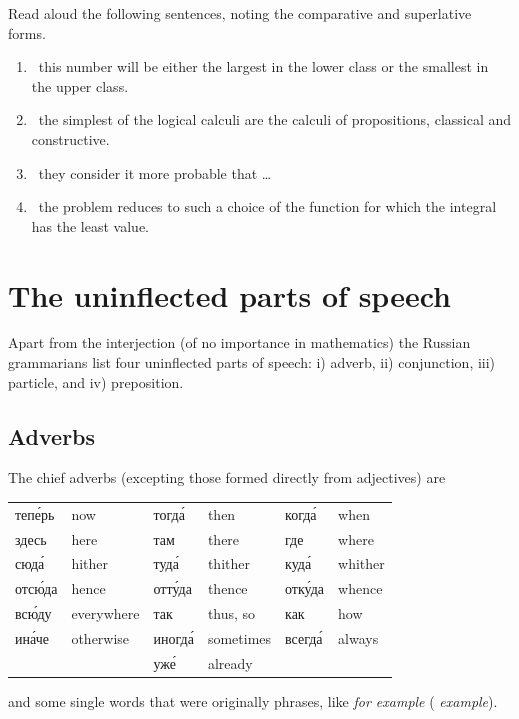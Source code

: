 \begin{keybox}[Exercise 3.6]
Read aloud the following sentences, noting the comparative and superlative forms.
\end{keybox}

\begin{enumerate}[label=\arabic*)]
\item {}\
      this number will be either the largest in the lower class or the smallest in the upper class.
\item {}\
      the simplest of the logical calculi are the calculi of propositions, classical and constructive.
\item \ru{счита́ют бо́лее вероя́тным, что \ldots}\
      they consider it more probable that \ldots
\item {}\
      the problem reduces to such a choice of the function for which the integral has the least value.
\end{enumerate}

\section{The uninflected parts of speech}

Apart from the interjection (of no importance in mathematics) the Russian grammarians list four uninflected parts of speech: i) adverb, ii) conjunction, iii) particle, and iv) preposition.

\subsection*{Adverbs}
The chief adverbs (excepting those formed directly from adjectives) are
\begin{center}
\small
\begin{tabular}{@{}>{\cyrillicfont}l l >{\cyrillicfont}l l >{\cyrillicfont}l l@{}}
тепе́рь & now & тогда́ & then & когда́ & when\\
здесь & here & там & there & где & where\\
сюда́ & hither & туда́ & thither & куда́ & whither\\
отсю́да & hence & отту́да & thence & отку́да & whence\\
всю́ду & everywhere & так & thus, so & как & how\\
ина́че & otherwise & иногда́ & sometimes & всегда́ & always\\
& & уже́ & already & &
\end{tabular}
\end{center}
and some single words that were originally phrases, like  \emph{for example} ( \emph{example}).

